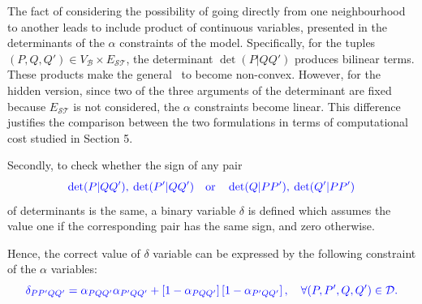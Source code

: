 \documentclass[a4paper,  review, authoryear, 1p.]{elsarticle}
\newcommand{\KMPN}{{\sf{H-KMPN}\xspace }}
\newcommand{\VB}{{V^{}_{\mathcal B}}}
\newcommand{\JP}[1]{{\color{armygreen}#1}}
\newcommand{\CV}[1]{{\color{blue}#1}}
\newcommand{\determinant}[3]{\det({#1|#2#3})}
\begin{document}
	\JP{The fact of considering the possibility of going directly from one neighbourhood  to another leads to include product of continuous variables, presented in the determinants of the $\alpha$ constraints of the model. Specifically, for the tuples $(P, Q, Q')\in V_\mathcal B\times E_{\mathcal S\mathcal T}$, the determinant $\det(P|QQ')$ produces bilinear terms. These products make the general \KMPN \ to become non-convex. However, for the hidden version, since two of the three arguments of the determinant are fixed because $E_{\mathcal S\mathcal T}$ is not considered, the $\alpha$ constraints become linear. This difference justifies the comparison between the two formulations in terms of computational cost studied in Section 5.}
			 
	Secondly, to check whether the sign of any pair
	\begin{equation}\label{eq:pair}
		\CV{\determinant{P}{Q}{Q'},\: \determinant{P'}{Q}{Q'}\quad \text{or} \quad \determinant{Q}{P}{P'},\:	 \determinant{Q'}{P}{P'}}
	\end{equation} 
	of determinants is the same, a binary variable $\delta$ is defined which assumes the value one if the corresponding pair has the same sign, and zero otherwise.
	
	\newcommand{\varepsilonprod}[4]{\varepsilon_{#1#2#3#4}}
	
	Hence, the correct value of $\delta$ variable can be expressed by the following constraint of the $\alpha$ variables:
	\begin{equation*}%
		\CV{\deltamas{P}{P'}{Q}{Q'}=\alphamas{P}{Q}{Q'}\alphamas{P'}{Q}{Q'} + \left[1-\alphamas{P}{Q}{Q'}\right]\left[1-\alphamas{P'}{Q}{Q'}\right],\quad\forall (P,P',Q,Q')\in\mathcal D.}	
	\end{equation*}
	
\end{document}
